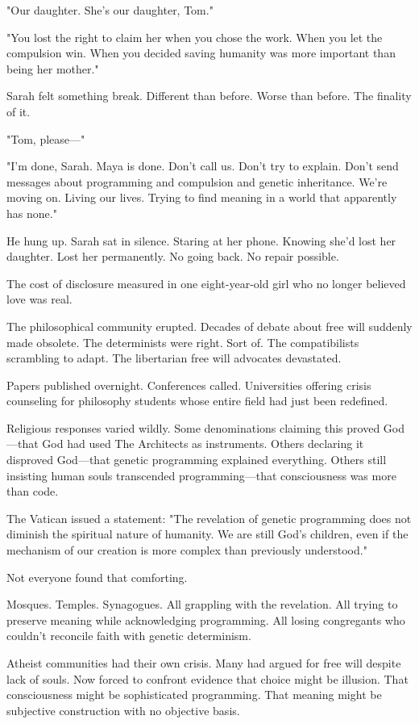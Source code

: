 "Our daughter. She's our daughter, Tom."

"You lost the right to claim her when you chose the work. When you let the compulsion win. When you decided saving humanity was more important than being her mother."

Sarah felt something break. Different than before. Worse than before. The finality of it.

"Tom, please—"

"I'm done, Sarah. Maya is done. Don't call us. Don't try to explain. Don't send messages about programming and compulsion and genetic inheritance. We're moving on. Living our lives. Trying to find meaning in a world that apparently has none."

He hung up. Sarah sat in silence. Staring at her phone. Knowing she'd lost her daughter. Lost her permanently. No going back. No repair possible.

The cost of disclosure measured in one eight-year-old girl who no longer believed love was real.

\scenebreak

The philosophical community erupted. Decades of debate about free will suddenly made obsolete. The determinists were right. Sort of. The compatibilists scrambling to adapt. The libertarian free will advocates devastated.

Papers published overnight. Conferences called. Universities offering crisis counseling for philosophy students whose entire field had just been redefined.

Religious responses varied wildly. Some denominations claiming this proved God—that God had used The Architects as instruments. Others declaring it disproved God—that genetic programming explained everything. Others still insisting human souls transcended programming—that consciousness was more than code.

The Vatican issued a statement: "The revelation of genetic programming does not diminish the spiritual nature of humanity. We are still God's children, even if the mechanism of our creation is more complex than previously understood."

Not everyone found that comforting.

Mosques. Temples. Synagogues. All grappling with the revelation. All trying to preserve meaning while acknowledging programming. All losing congregants who couldn't reconcile faith with genetic determinism.

Atheist communities had their own crisis. Many had argued for free will despite lack of souls. Now forced to confront evidence that choice might be illusion. That consciousness might be sophisticated programming. That meaning might be subjective construction with no objective basis.

